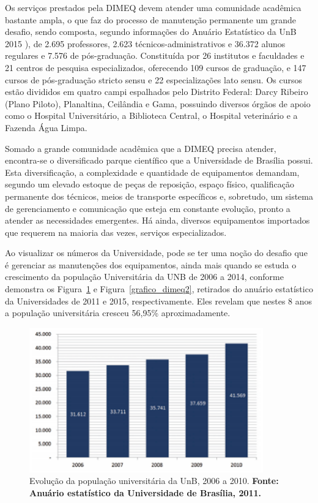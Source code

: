 Os serviços prestados pela DIMEQ devem atender uma comunidade acadêmica bastante ampla, o que faz do processo de manutenção permanente um grande desafio, sendo composta, segundo informações do Anuário Estatístico da UnB 2015 \cite{anuario2015}), de 2.695 professores, 2.623 técnicos-administrativos e 36.372 alunos regulares e 7.576 de pós-graduação. Constituída por 26 institutos e faculdades e 21 centros de pesquisa especializados, oferecendo 109 cursos de graduação, e 147 cursos de pós-graduação stricto sensu e 22 especializações lato sensu. Os cursos estão divididos em quatro campi espalhados pelo Distrito Federal: Darcy Ribeiro (Plano Piloto), Planaltina, Ceilândia e Gama, possuindo diversos órgãos de apoio como o Hospital Universitário, a Biblioteca Central, o Hospital veterinário e a Fazenda Água Limpa.

Somado a grande comunidade acadêmica que a DIMEQ precisa atender, encontra-se o diversificado parque científico que a Universidade de Brasília possui. Esta diversificação, a complexidade e quantidade de equipamentos demandam, segundo \cite{limacastilho2006} um elevado estoque de peças de reposição, espaço físico, qualificação permanente dos técnicos, meios de transporte específicos e, sobretudo, um sistema de gerenciamento e comunicação que esteja em constante evolução, pronto a atender as necessidades emergentes. Há ainda, diversos equipamentos importados que requerem na maioria das vezes, serviços especializados.

Ao visualizar os números da Universidade, pode se ter uma noção do desafio que é gerenciar as manutenções dos equipamentos, ainda mais quando se estuda o crescimento da população Universitária da UNB de 2006 a 2014, conforme demonstra os Figura~\ref{grafico_dimeq1} e Figura~\ref{grafico_dimeq2}, retirados do anuário estatístico da Universidades de 2011 e 2015, respectivamente. Eles revelam que nestes 8 anos a população universitária cresceu 56,95\% aproximadamente.

\graphicspath{{figuras/}}
\begin{figure}[H]
\centering
\includegraphics[width=0.9\textwidth]{grafico_dimeq1}
\caption{Evolução da população universitária da UnB, 2006 a 2010. \textbf{Fonte: Anuário estatístico da Universidade de Brasília, 2011.}}
\label{grafico_dimeq1}
\end{figure}


